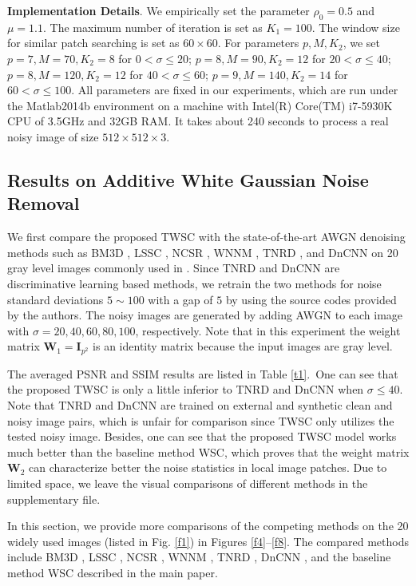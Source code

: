 \textbf{Implementation Details}. We empirically set the parameter $\rho_{0}=0.5$ and $\mu=1.1$. The maximum number of iteration is set as $K_{1}=100$. The window size for similar patch searching is set as $60\times60$. For parameters $p,M,K_{2}$, we set $p=7,M=70,K_{2}=8$ for $0<\sigma\le20$; $p=8,M=90,K_{2}=12$ for $20<\sigma\le40$; $p=8,M=120,K_{2}=12$ for $40<\sigma\le60$; $p=9,M=140,K_{2}=14$ for $60<\sigma\le100$. All parameters are fixed in our experiments, which are run under the Matlab2014b environment on a machine with Intel(R) Core(TM) i7-5930K CPU of 3.5GHz and 32GB RAM. It takes about 240 seconds to process a real noisy image of size $512\times512\times3$.


\subsection{Results on Additive White Gaussian Noise Removal}

We first compare the proposed TWSC with the state-of-the-art AWGN denoising methods such as BM3D \cite{bm3d}, LSSC \cite{lssc}, NCSR \cite{ncsr}, WNNM \cite{wnnm}, TNRD \cite{chen2015learning}, and DnCNN \cite{dncnn} on 20 gray level images commonly used in \cite{bm3d}. Since TNRD and DnCNN are discriminative learning based methods, we retrain the two methods for noise standard deviations $5\sim100$ with a gap of $5$ by using the source codes provided by the authors. The noisy images are generated by adding AWGN to each image with $\sigma=20,40,60,80,100$, respectively. Note that in this experiment the weight matrix $\bm{W}_{1}=\bm{I}_{p^2}$ is an identity matrix because the input images are gray level.

The averaged PSNR and SSIM \cite{ssim} results are listed in Table \ref{t1}.\ One can see that the proposed TWSC is only a little inferior to TNRD and DnCNN when $\sigma\le40$. Note that TNRD and DnCNN are trained on external and synthetic clean and noisy image pairs, which is unfair for comparison since TWSC only utilizes the tested noisy image. Besides, one can see that the proposed TWSC model works much better than the baseline method WSC, which proves that the weight matrix $\bm{W}_{2}$ can characterize better the noise statistics in local image patches. Due to limited space, we leave the visual comparisons of different methods in the supplementary file.

In this section, we provide more comparisons of the competing methods on the 20 widely used images (listed in Fig. \ref{f1}) in Figures \ref{f4}--\ref{f8}. The compared methods include BM3D \cite{bm3d}, LSSC \cite{lssc}, NCSR \cite{ncsr}, WNNM \cite{wnnm}, TNRD \cite{chen2015learning}, DnCNN \cite{dncnn}, and the baseline method WSC described in the main paper.
 
